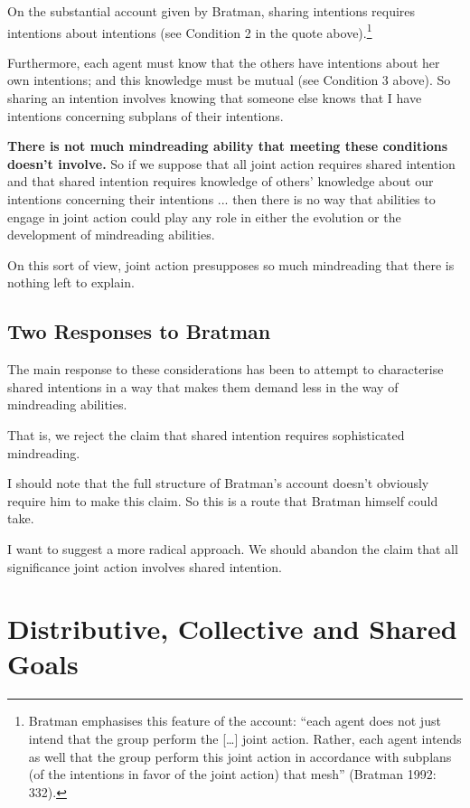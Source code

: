 \documentclass[12pt,a4paper]{extarticle}
\begin{document}
On the substantial account given by Bratman, sharing intentions requires intentions about intentions (see Condition 2 in the quote above).\footnote{
Bratman emphasises this feature of the account: “each agent does not just intend that the group perform the […] joint action. Rather, each agent intends as well that the group perform this joint action in accordance with subplans (of the intentions in favor of the joint action) that mesh” (Bratman 1992: 332).
}

Furthermore, each agent must know that the others have intentions about her own intentions; and this knowledge must be mutual (see Condition 3 above).  So sharing an intention involves knowing that someone else knows that I have intentions concerning subplans of their intentions.  

\textbf{There is not much mindreading ability that meeting these conditions doesn't involve.}  
So if we suppose that all joint action requires shared intention and that shared intention requires knowledge of others' knowledge about our intentions concerning their intentions ... then there is no way that abilities to engage in joint action could play any role in either the evolution or the development of mindreading abilities.

On this sort of view, joint action presupposes so much mindreading that there is nothing left to explain.


\subsection{Two Responses to Bratman}
The main response to these considerations has been to attempt to characterise shared intentions in a way that makes them demand less in the way of mindreading abilities.

That is, we reject the claim that shared intention requires sophisticated mindreading.

I should note that the full structure of Bratman's account doesn't obviously require him to make this claim.  So this is a route that Bratman himself could take.

I want to suggest a more radical approach.
We should abandon the claim that all significance joint action involves shared intention.





\section{Distributive, Collective and Shared Goals}
\end{document}
